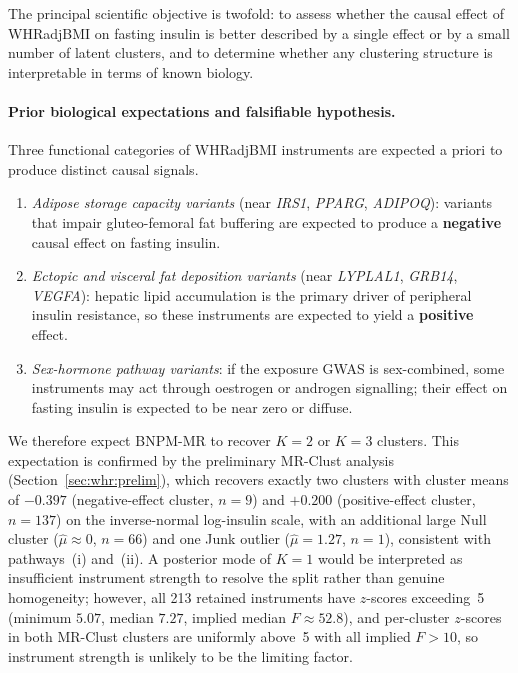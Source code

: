 \documentclass[12pt,a4paper]{article}
\newcommand{\FILLED}[1]{{\color{black}#1}}   %
\begin{document}
The principal scientific objective is twofold: to assess whether the causal
effect of WHRadjBMI on fasting insulin is better described by a single
effect or by a small number of latent clusters, and to determine whether any
clustering structure is interpretable in terms of known biology.

\paragraph{Prior biological expectations and falsifiable hypothesis.}
Three functional categories of WHRadjBMI instruments are expected a priori
to produce distinct causal signals.

\begin{enumerate}[label=(\roman*)]
  \item \emph{Adipose storage capacity variants} (near \textit{IRS1},
        \textit{PPARG}, \textit{ADIPOQ}): variants that impair
        gluteo-femoral fat buffering are expected to produce a
        \textbf{negative} causal effect on fasting insulin.
  \item \emph{Ectopic and visceral fat deposition variants} (near
        \textit{LYPLAL1}, \textit{GRB14}, \textit{VEGFA}): hepatic lipid
        accumulation is the primary driver of peripheral insulin resistance,
        so these instruments are expected to yield a \textbf{positive}
        effect.
  \item \emph{Sex-hormone pathway variants}: if the exposure GWAS is
        sex-combined, some instruments may act through oestrogen or androgen
        signalling; their effect on fasting insulin is expected to be near
        zero or diffuse.
\end{enumerate}

We therefore expect BNPM-MR to recover $K = 2$ or $K = 3$ clusters.
\FILLED{This expectation is confirmed by the preliminary MR-Clust analysis
(Section~\ref{sec:whr:prelim}), which recovers exactly two clusters with
cluster means of $-0.397$ (negative-effect cluster, $n=9$) and $+0.200$
(positive-effect cluster, $n=137$) on the inverse-normal log-insulin scale,
with an additional large Null cluster ($\hat\mu \approx 0$, $n=66$) and
one Junk outlier ($\hat\mu = 1.27$, $n=1$),
consistent with pathways~(i) and~(ii).}  A posterior mode of $K = 1$ would
be interpreted as insufficient instrument strength to resolve the split
rather than genuine homogeneity; \FILLED{however, all 213 retained
instruments have $z$-scores exceeding~5 (minimum $5.07$, median $7.27$,
implied median $F \approx 52.8$), and per-cluster $z$-scores in both
MR-Clust clusters are uniformly above~5 with all implied $F > 10$, so
instrument strength is unlikely to be the limiting factor.}
\end{document}
